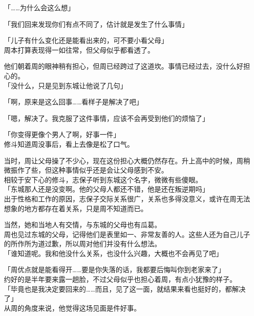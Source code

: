「……为什么会这么想」

「我们回来发现你们有点不同了，估计就是发生了什么事情」

「儿子有什么变化还是能看出来的，可不要小看父母」\\

周本打算表现得一如往常，但父母似乎都看透了。

他们朝着周的眼神稍有担心，但周已经跨过了这道坎。事情已经过去，没什么好担心的。\\

「没什么，只是见到东城让他说了几句」

「啊，原来是这么回事……看样子是解决了吧」

「嗯，解决了。我克服了这件事情，应该不会再受到他们的烦恼了」

「你变得更像个男人了啊，好事一件」\\

修斗知道周没事后，看上去像是松了口气。

当时，周让父母操了不少心，现在这份担心大概仍然存在。升上高中的时候，周稍微振作了些，但这种事情似乎还是会让父母感到不安。\\

相较于安下心的修斗，志保子听到东城这个名字，微微有些傻眼。\\

「东城那人还是没变啊。他的父母人都还不错，他是还在叛逆期吗」\\

出于性格和工作的原因，志保子交际关系很广，关系也多得没意义，或许在周无法想象的地方都存在着关系，只是周不知道而已。

当然，她和当地人有交情，与东城的父母也有瓜葛。\\

周也见过东城的父母，记得他们是表里如一、非常友善的人。这些人还为自己儿子的所作所为道过歉，所以周对他们并没有什么想法。\\

「谁知道呢。我和他没什么关系，也没什么兴趣，大概也不会再见了吧」

「周优点就是能看得开……要是你失落的话，我都要后悔叫你到老家来了」\\

约好的是半年要来露一趟脸，不过父母似乎也担心着周，有点小犹豫的样子。\\

「毕竟也是我决定要回来的……而且，见了这一面，就结果来看也挺好的，都解决了」\\

从周的角度来说，他觉得这场见面是件好事。

